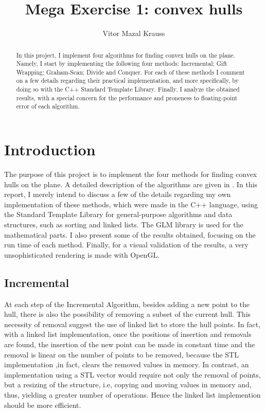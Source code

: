 \documentclass[a4paper, 10pt, conference]{ieeeconf}      %
\title{\LARGE \bf
Mega Exercise 1: convex hulls
}
\author{Vitor Mazal Krauss}
\begin{document}
\maketitle
\thispagestyle{empty}
\pagestyle{empty}


\begin{abstract}
In this project, I implement four algorithms for finding convex hulls on the plane.
Namely, I start by implementing the following four methods: Incremental; Gift Wrapping; Graham-Scan; Divide and Conquer.
For each of these methods I comment on a few details regarding their practical implementation, and more specifically, by doing so with the C++ Standard Template Library.
Finally, I analyze the obtained results, with a special concern for the performance and proneness to floating-point error of each algorithm.
\end{abstract}


\section{Introduction}
The purpose of this project is to implement the four methods for finding convex hulls on the plane.
A detailed description of the algorithms are given in \cite{dcg}.
In this report, I merely intend to discuss a few of the details regarding my own implementation of these methods, which were made in the C++ language, using the Standard Template Library for general-purpose algorithms and data structures, such as sorting and linked lists.
The GLM library is used for the mathematical parts.
I also present some of the results obtained, focusing on the run time of each method.
Finally, for a visual validation of the results, a very unsophisticated rendering is made with OpenGL.


\subsection{Incremental}
At each step of the Incremental Algorithm, besides adding a new point to the hull, there is also the possibility of removing a subset of the current hull.
This necessity of removal suggest the use of linked list to store the hull points.
In fact, with a linked list implementation, once the positions of insertion and removals are found, the insertion of the new point can be made in constant time and the removal is linear on the number of points to be removed, because the STL implementation ,in fact, clears the removed values in memory.
In contrast, an implementation using a STL vector would require not only the removal of points, but a resizing of the structure, i.e, copying and moving values in memory and, thus, yielding a greater number of operations.
Hence the linked list implemention should be more efficient.
\end{document}
